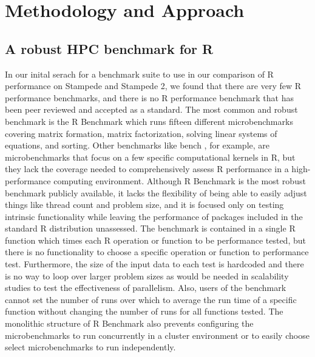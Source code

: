 \section{Methodology and Approach}\label{sec:methodology}

\subsection{A robust HPC benchmark for R} \label{sec:hpcBenchmark}

In our inital serach for a benchmark suite to use in our comparison of R performance on
Stampede and Stampede 2, we found that there are very few R performance benchmarks, and
there is no R performance benchmark that has been peer reviewed and accepted as a
standard. The most common and robust benchmark is the R Benchmark
\cite{urbanek:Rbenchmarks} which runs fifteen different microbenchmarks covering matrix
formation, matrix factorization, solving linear systems of equations, and sorting. Other
benchmarks like bench \cite{urbanek:Rbenchmarks}, for example, are microbenchmarks that
focus on a few specific computational kernels in R, but they lack the coverage needed to
comprehensively assess R performance in a high-performance computing environment. Although
R Benchmark is the most robust benchmark publicly available, it lacks the flexibility of
being able to easily adjust things like thread count and problem size, and it is focused
only on testing intrinsic functionality while leaving the performance of packages included
in the standard R distribution unassessed.  The benchmark is contained in a single R
function which times each R operation or function to be performance tested, but there is
no functionality to choose a specific operation or function to performance test.
Furthermore, the size of the input data to each test is hardcoded and there is no way to
loop over larger problem sizes as would be needed in scalability studies to test the
effectiveness of parallelism. Also, users of the benchmark cannot set the number of runs
over which to average the run time of a specific function without changing the number of
runs for all functions tested. The monolithic structure of R Benchmark also prevents
configuring the microbenchmarks to run concurrently in a cluster environment or to easily
choose select microbenchmarks to run independently.

